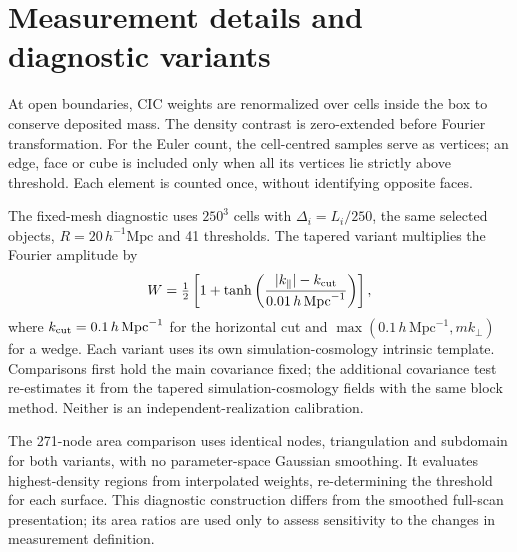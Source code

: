 \section{Measurement details and diagnostic variants}\label{app:implementation}
At open boundaries, CIC weights are renormalized over cells inside the box to conserve deposited mass. The density contrast is zero-extended before Fourier transformation. For the Euler count, the cell-centred samples serve as vertices; an edge, face or cube is included only when all its vertices lie strictly above threshold. Each element is counted once, without identifying opposite faces.

The fixed-mesh diagnostic uses $250^3$ cells with $\Delta_i=L_i/250$, the same selected objects, $R=20\,h^{-1}\mathrm{Mpc}$ and 41 thresholds. The tapered variant multiplies the Fourier amplitude by
\begin{equation}
W=\tfrac12\left[1+\tanh\left(\frac{|k_\parallel|-k_{\rm cut}}{0.01\,h\,\mathrm{Mpc}^{-1}}\right)\right],
\end{equation}
where $k_{\rm cut}=0.1\,h\,\mathrm{Mpc}^{-1}$ for the horizontal cut and $\max(0.1\,h\,\mathrm{Mpc}^{-1},mk_\perp)$ for a wedge. Each variant uses its own simulation-cosmology intrinsic template. Comparisons first hold the main covariance fixed; the additional covariance test re-estimates it from the tapered simulation-cosmology fields with the same block method. Neither is an independent-realization calibration.

The 271-node area comparison uses identical nodes, triangulation and subdomain for both variants, with no parameter-space Gaussian smoothing. It evaluates highest-density regions from interpolated weights, re-determining the threshold for each surface. This diagnostic construction differs from the smoothed full-scan presentation; its area ratios are used only to assess sensitivity to the changes in measurement definition.
